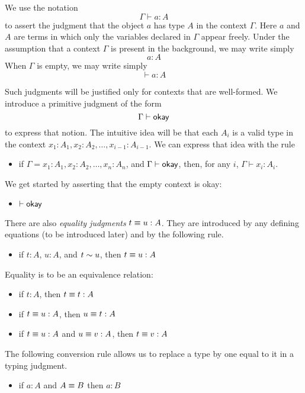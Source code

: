 We use the notation
\[
  \Gamma \vdash a:A
\]
to assert the judgment that the object $a$ has type $A$ in the context
$\Gamma$.  Here $a$ and $A$ are terms in which only the variables declared in
$\Gamma$ appear freely.  Under the assumption that a context $\Gamma$ is
present in the background, we may write simply
\[
  a:A
\]
When $\Gamma$ is empty, we may write simply
\[
  \vdash a:A
\]

Such judgments will be justified only for contexts that are well-formed.  We
introduce a primitive judgment of the form
\[
  \Gamma \vdash \mathop{\textsf{okay}}
\]
to express that notion.  The intuitive idea will be that each $A_i$ is a valid
type in the context $x_1:A_1, x_2:A_2,\dots,x_{i-1}:A_{i-1}$.  We can express that idea with 
the rule

\begin{itemize}
\item if $\Gamma =  x_1:A_1, x_2:A_2,\dots,x_n:A_n$, and $\Gamma \vdash \mathop{\textsf{okay}}$, then, for any $i$, $\Gamma \vdash x_i : A_i$.
\end{itemize}

We get started by asserting that the empty context is okay:

\begin{itemize}
\item $\vdash \mathop{\textsf{okay}}$
\end{itemize}

There are also {\em equality judgments} $t \equiv u : A$.  They are introduced
by any defining equations (to be introduced later) and by the following rule.

\begin{itemize}
\item if $t:A$, $u:A$, and $t \sim u$, then $t \equiv u : A$
\end{itemize}

Equality is to be an equivalence relation:

\begin{itemize}
\item if $t:A$, then $t \equiv t : A$
\item if $t \equiv u : A$, then $u \equiv t : A$
\item if $t \equiv u : A$ and $u \equiv v : A$, then $t \equiv v : A$
\end{itemize}

The following conversion rule allows us to replace a type by one equal to it in
a typing judgment.

\begin{itemize}
\item if $a:A$ and $A \equiv B$ then $a:B$
\end{itemize}

